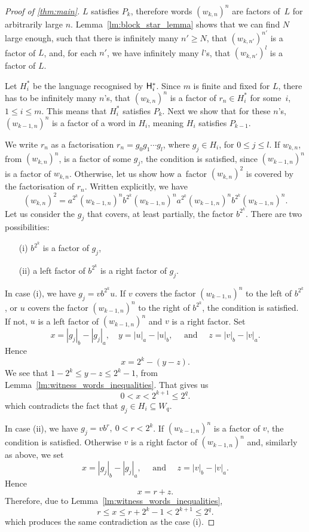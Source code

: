 \begin{proof}[Proof of \autoref*{thm:main}]
    $L$ satisfies $P_k$, therefore words ${(w_{k,n})}^n$ are factors of~$L$ for arbitrarily large $n$. Lemma~\ref*{lm:block_star_lemma} shows that we can find $N$ large enough, such that there is infinitely many $n' \geq N$, that ${(w_{k,n'})}^{n'}$ is a factor of $L$, and, for each $n'$, we have infinitely many $l$'s, that ${(w_{k,n'})}^l$ is a factor of $L$.

    Let $H_i^*$ be the language recognised by ${\mathsf{H}}_i^*$. Since $m$ is finite and fixed for $L$, there has to be infinitely many $n$'s, that ${(w_{k,n})}^n$ is a factor of $r_n \in H_i^*$ for some~$i$, $1 \leq i \leq m$. This means that $H_i^*$ satisfies $P_k$. Next we show that for these $n$'s, ${(w_{k-1,n})}^n$ is a factor of a word in $H_i$, meaning $H_i$ satisfies $P_{k-1}$.

    We write $r_n$ as a factorisation $r_n = g_0 g_1 \dotsm g_l$, where $g_j \in H_i$, for $0 \leq j \leq l$. If $w_{k,n}$, from ${(w_{k,n})}^n$, is a factor of some $g_j$, the condition is satisfied, since ${(w_{k-1,n})}^n$ is a factor of $w_{k,n}$. Otherwise, let us show how a~factor ${(w_{k,n})}^2$ is covered by the factorisation of $r_n$. Written explicitly, we have
    \[
        {(w_{k,n})}^2 = a^{2^k}{(w_{k-1,n})}^{n}b^{2^k}{(w_{k-1,n})}^{n}a^{2^k}{(w_{k-1,n})}^{n}b^{2^k}{(w_{k-1,n})}^{n}.
    \]
    Let us consider the $g_j$ that covers, at least partially, the factor $b^{2^k}$. There are two possibilities:
    \begin{itemize}
        \item[(i)] $b^{2^k}$ is a factor of $g_j$,
        \item[(ii)] a left factor of $b^{2^k}$ is a right factor of $g_j$.
    \end{itemize}

    In case (i), we have $g_j = v b^{2^k} u$. If $v$ covers the factor ${(w_{k-1,n})}^{n}$ to the left of $b^{2^k}$, or $u$ covers the factor ${(w_{k-1,n})}^{n}$ to the right of $b^{2^k}$, the condition is satisfied. If not, $u$ is a left factor of ${(w_{k-1,n})}^{n}$ and $v$ is a right factor. Set
    \[
        x = |g_j|_b - |g_j|_a, \quad y = |u|_a - |u|_b, \quad \text{ and } \quad z = |v|_b - |v|_a.
    \]
    Hence
    \[
        x = 2^k - (y - z).
    \]
    We see that $1 - 2^k \leq y - z \leq 2^k - 1$, from Lemma~\ref*{lm:witness_words_inequalities}. That gives us
    \[
        0 < x < 2^{k+1} \leq 2^q.
    \]
    which contradicts the fact that $g_j \in H_i \subseteq W_q$.

    In case (ii), we have $g_j = v b^{r}, \: 0 < r < 2^k$. If ${(w_{k-1,n})}^{n}$ is a factor of $v$, the condition is satisfied. Otherwise $v$ is a right factor of ${(w_{k-1,n})}^{n}$ and, similarly as above, we set
    \[
        x = |g_j|_b - |g_j|_a, \quad \text{ and } \quad z = |v|_b - |v|_a.
    \]
    Hence
    \[
        x = r + z.
    \]
    Therefore, due to Lemma~\ref*{lm:witness_words_inequalities},
    \[
        r \leq x \leq r + 2^k - 1 < 2^{k+1} \leq 2^q.
    \]
    which produces the same contradiction as the case (i).
\end{proof}